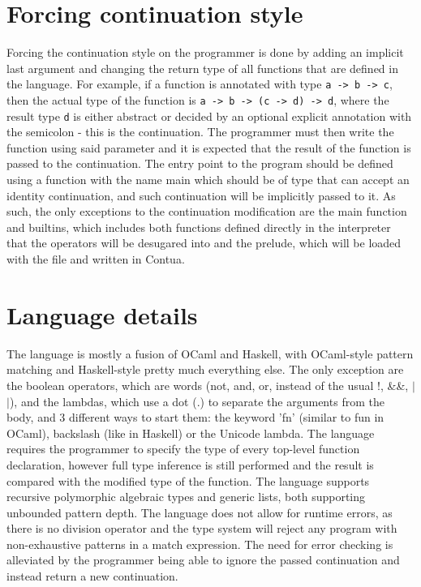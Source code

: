 \documentclass{article}
\begin{document}
	\section{Forcing continuation style}
	Forcing the continuation style on the programmer is done by adding an implicit last argument
	and changing the return type of all functions that are defined in the language.
	For example, if a function is annotated with type \texttt{a -> b -> c},
	then the actual type of the function is \texttt{a -> b -> (c -> d) -> d},
	where the result type \texttt{d} is either abstract or decided by an optional explicit annotation with the semicolon - this is the continuation.
	The programmer must then write the function using said parameter and it is expected that 
	the result of the function is passed to the continuation. The entry point to the program should be defined using a function with the name main which should be of type that can accept an identity continuation, and such continuation will be implicitly passed to it.
	As such, the only exceptions to the continuation modification are the main function and builtins, which includes both functions defined directly in the interpreter that the operators will be desugared into and the prelude, which will be loaded with the file and written in Contua.
	
	\section{Language details}
	The language is mostly a fusion of OCaml and Haskell, with OCaml-style pattern matching and
	Haskell-style pretty much everything else. The only exception are the boolean operators,
	which are words (not, and, or, instead of the usual !, \&\&, $|$$|$), and the lambdas, which
	use a dot (.) to separate the arguments from the body, and 3 different ways to start them:
	the keyword 'fn' (similar to fun in OCaml), backslash (like in Haskell) or the Unicode lambda.
	The language requires the programmer to specify the type of every top-level function declaration, however full type inference is still performed and the result is compared with the modified type of the function.
	The language supports recursive polymorphic algebraic types and generic lists, both supporting 
	unbounded pattern depth. The language does not allow for runtime errors, as there is no division operator and the type system will reject any program with non-exhaustive patterns in a match expression. The need for error checking is alleviated by the programmer being able to ignore the passed continuation and instead return a new continuation.
\end{document}
